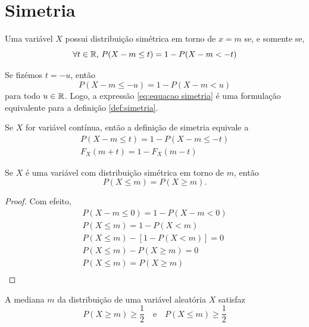 \section{Simetria}

\begin{def:simetria}
\label{def:simetria}
Uma variável $X$ possui distribuição simétrica em torno de $x = m$ se, e somente se,
\[
    \forall t \in \mathbb{R},\, P(X - m \le t) = 1 - P(X - m < -t)
\]
\end{def:simetria}

\begin{obs:simetria 1}
Se fizémos $t = -u$, então
\begin{equation}
\label{eq:equacao simetria}
    P(X - m \le -u)  = 1 - P(X - m < u)
\end{equation}
para todo $u \in \mathbb{R}$.
Logo, a expressão \ref{eq:equacao simetria} é uma formulação equivalente para
a definição \ref{def:simetria}.
\end{obs:simetria 1}

\begin{obs:simetria 2}
Se $X$ for variável contínua, então a definição de simetria equivale a
\begin{gather*}
	P(X - m \le t) = 1 - P(X - m \le -t) \\
	F_X(m+t) = 1 - F_X(m-t)
\end{gather*}
\end{obs:simetria 2}

\begin{prop:equivalencia simetria}
\label{prop:equivalencia simetria}
Se $X$ é uma variável com distribuição simétrica em torno de $m$, então
\[
    P(X \le m) = P(X \ge m ).
\]
\end{prop:equivalencia simetria}
\begin{proof}
Com efeito,
\begin{gather*}
P(X - m \le 0) = 1 - P(X - m < 0) \\
P(X \le m) = 1 - P(X < m) \\
P(X \le m) - [1 - P(X < m)] = 0 \\
P(X \le m) - P(X \ge m) = 0 \\
P(X \le m) = P(X \ge m) \\
\end{gather*}
\end{proof}

\begin{def:mediana}
\label{def:mediana}
A mediana $m$ da distribuição de uma variável aleatória $X$ satisfaz
\[
    P(X \ge m) \ge \frac 1 2 \quad \text{e} \quad P(X \le m) \ge \frac 1 2
\]
\end{def:mediana}

